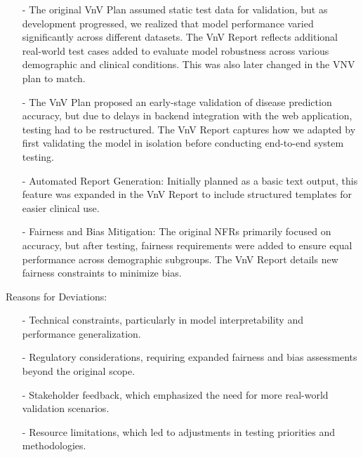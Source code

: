 \documentclass[12pt, titlepage]{article}
\begin{document}
    \begin{itemize}
    \item[-] The original VnV Plan assumed static test data for validation, but as development progressed, we realized that model performance varied significantly across different datasets. The VnV Report reflects additional real-world test cases added to evaluate model robustness across various demographic and clinical conditions. This was also later changed in the VNV plan to match.
    \item[-] The VnV Plan proposed an early-stage validation of disease prediction accuracy, but due to delays in backend integration with the web application, testing had to be restructured. The VnV Report captures how we adapted by first validating the model in isolation before conducting end-to-end system testing.
    \item[-] Automated Report Generation: Initially planned as a basic text output, this feature was expanded in the VnV Report to include structured templates for easier clinical use.
    \item[-] Fairness and Bias Mitigation: The original NFRs primarily focused on accuracy, but after testing, fairness requirements were added to ensure equal performance across demographic subgroups. The VnV Report details new fairness constraints to minimize bias.
    \end{itemize}

    Reasons for Deviations:
    \begin{itemize}
    \item[-] Technical constraints, particularly in model interpretability and performance generalization.
    \item[-] Regulatory considerations, requiring expanded fairness and bias assessments beyond the original scope.
    \item[-] Stakeholder feedback, which emphasized the need for more real-world validation scenarios.
    \item[-] Resource limitations, which led to adjustments in testing priorities and methodologies.
    \end{itemize}
    
\end{document}
